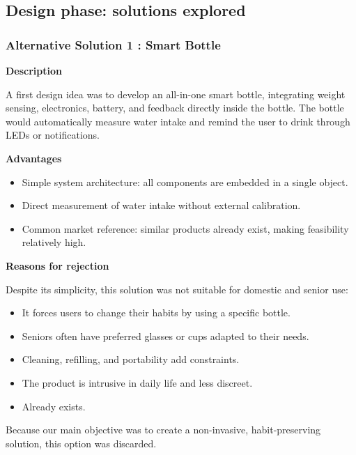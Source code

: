 \documentclass{article}
\begin{document}
\subsection{Design phase: solutions explored}
\subsubsection*{Alternative Solution 1 : Smart Bottle }

\textbf{Description}\vspace{0.2cm}

A first design idea was to develop an all-in-one smart bottle, integrating weight sensing, electronics, battery, and feedback directly inside the bottle. The bottle would automatically measure water intake and remind the user to drink through LEDs or notifications.\vspace{0.2cm}

\textbf{Advantages}
\begin{itemize}
    \item Simple system architecture: all components are embedded in a single object.
    \item Direct measurement of water intake without external calibration.
    \item Common market reference: similar products already exist, making feasibility relatively high.
\end{itemize}

\textbf{Reasons for rejection}\vspace{0.2cm}

Despite its simplicity, this solution was not suitable for domestic and senior use:
\begin{itemize}
    \item It forces users to change their habits by using a specific bottle.
    \item Seniors often have preferred glasses or cups adapted to their needs.
    \item Cleaning, refilling, and portability add constraints.
    \item The product is intrusive in daily life and less discreet.
    \item Already exists.
\end{itemize}

Because our main objective was to create a non-invasive, habit-preserving solution, this option was discarded.

\vspace{0.5cm}
\end{document}

